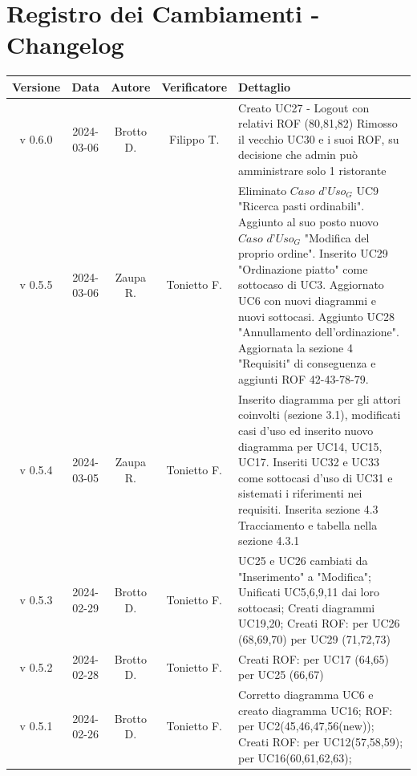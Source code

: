 \documentclass[12pt, oneside]{article}
\begin{document}
\section*{Registro dei Cambiamenti - Changelog}
\begin{longtable}{|c|c|c|c|p{7cm}|}
\hline
\textbf{Versione} & \textbf{Data} & \textbf{Autore} & \textbf{Verificatore} & 
\textbf{Dettaglio} \\
\hline
v 0.6.0 & 2024-03-06 & Brotto D. & Filippo T. & Creato UC27 - Logout con relativi ROF (80,81,82) 
\newline Rimosso il vecchio UC30 e i suoi ROF, su decisione che admin può amministrare solo 1 ristorante
\\
\hline
v 0.5.5 & 2024-03-06 & Zaupa R. & Tonietto F. & Eliminato $\textit{Caso d'Uso}_G$ UC9 "Ricerca pasti ordinabili". Aggiunto al suo posto nuovo $\textit{Caso d'Uso}_G$ "Modifica del proprio ordine". Inserito UC29 "Ordinazione piatto" come sottocaso di UC3. Aggiornato UC6 con nuovi diagrammi e nuovi sottocasi. Aggiunto UC28 "Annullamento dell'ordinazione". Aggiornata la sezione 4 "Requisiti" di conseguenza e aggiunti ROF 42-43-78-79. \\
\hline
v 0.5.4 & 2024-03-05 & Zaupa R. & Tonietto F. & Inserito diagramma per gli attori coinvolti (sezione 3.1), modificati casi d'uso ed inserito nuovo diagramma per UC14, UC15, UC17. Inseriti UC32 e UC33 come sottocasi d'uso di UC31 e sistemati i riferimenti nei requisiti. Inserita sezione 4.3 Tracciamento e tabella nella sezione 4.3.1\\
\hline
v 0.5.3 & 2024-02-29 & Brotto D. & Tonietto F. & UC25 e UC26 cambiati da "Inserimento" a "Modifica";
\newline Unificati UC5,6,9,11 dai loro sottocasi;
\newline Creati diagrammi UC19,20;
\newline Creati ROF:
\newline per UC26 (68,69,70)
\newline per UC29 (71,72,73)
\\
\hline
v 0.5.2 & 2024-02-28 & Brotto D. & Tonietto F. & Creati ROF:
\newline per UC17 (64,65) 
\newline per UC25 (66,67)
\\
\hline
v 0.5.1 & 2024-02-26 & Brotto D. & Tonietto F. & Corretto diagramma UC6 e creato diagramma UC16; \newline ROF: per UC2(45,46,47,56(new)); 
\newline Creati ROF: \newline per UC12(57,58,59); \newline per UC16(60,61,62,63); \\

\end{longtable}
\end{document}
